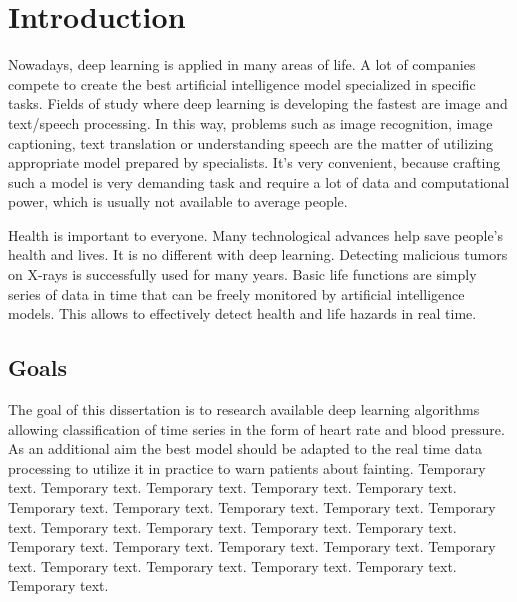 \chapter{Introduction}



\quad Nowadays, deep learning is applied in many areas of life. A lot of companies compete to create the best artificial intelligence model specialized in specific tasks. Fields of study where deep learning is developing the fastest are image and text/speech processing. In this way, problems such as image recognition, image captioning, text translation or understanding speech are the matter of utilizing appropriate model prepared by specialists. It's very convenient, because crafting such a model is very demanding task and require a lot of data and computational power, which is usually not available to average people.

Health is important to everyone. Many technological advances help save people's health and lives. It is no different with deep learning. Detecting malicious tumors on X-rays is successfully used for many years. Basic life functions are simply series of data in time that can be freely monitored by artificial intelligence models. This allows to effectively detect health and life hazards in real time.   



\section{Goals}

\quad The goal of this dissertation is to research available deep learning algorithms allowing classification of time series in the form of heart rate and blood pressure. As an additional aim the best model should be adapted to the real time data processing to utilize it in practice to warn patients about fainting. Temporary text. Temporary text. Temporary text. Temporary text. Temporary text. Temporary text. Temporary text. Temporary text. Temporary text. Temporary text. Temporary text. Temporary text. Temporary text. Temporary text. Temporary text. Temporary text. Temporary text. Temporary text. Temporary text. Temporary text. Temporary text. Temporary text. Temporary text. Temporary text.


